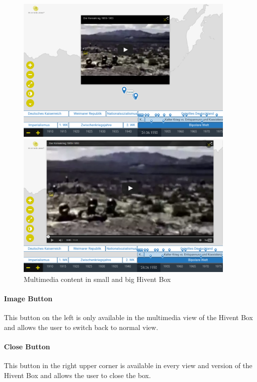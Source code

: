 \begin{figure}[H]
  \centering
  \begin{minipage}{0.49\textwidth}
    \includegraphics[width=0.95\textwidth]{graphics/bigBox_MM.png}
  \end{minipage}
  \label{fig:multimedia_content_small}
  \begin{minipage}{0.49\textwidth}
    \includegraphics[width=0.95\textwidth]{graphics/smallBox_MM.png}
  \end{minipage}
  \caption{Multimedia content in small and big Hivent Box}
  \label{fig:multimedia_content_small}
\end{figure}
\label{par:multimedia_button}

\paragraph{Image Button} %
This button on the left is only available in the multimedia view of the Hivent Box and allows the user to switch back to normal view. 
\paragraph{Close Button} %
This button in the right upper corner is available in every view and version of the Hivent Box and allows the user to close the box.